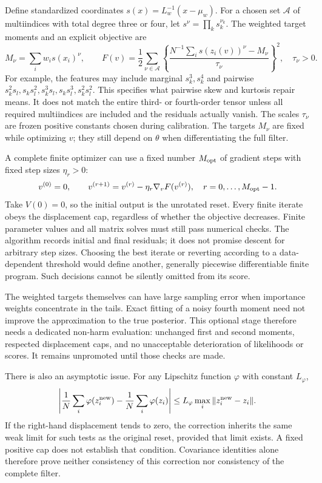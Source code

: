 \documentclass[11pt,a4paper]{article}
\begin{document}
Define standardized coordinates \(s(x)=L_w^{-1}(x-\mu_w)\).
For a chosen set \(\mathcal A\) of multiindices with total degree three
or four, let \(s^\nu=\prod_k s_k^{\nu_k}\). The weighted target moments
and an explicit objective are
\begin{equation}
\label{eq:moment-objective}
 M_\nu=\sum_iw_i s(x_i)^\nu,\qquad
 F(v)=\frac12\sum_{\nu\in\mathcal A}
 \left\{\frac{N^{-1}\sum_i s(z_i(v))^\nu-M_\nu}{\tau_\nu}\right\}^{\!2},
 \quad \tau_\nu>0 .
\end{equation}
For example, the features may include marginal \(s_k^3,s_k^4\) and
pairwise \(s_k^2s_l,s_ks_l^2,s_k^3s_l,s_ks_l^3,s_k^2s_l^2\).
This specifies what pairwise skew and kurtosis repair means. It does not
match the entire third- or fourth-order tensor unless all required
multiindices are included and the residuals actually vanish.
The scales \(\tau_\nu\) are frozen positive constants chosen during
calibration. The targets \(M_\nu\) are fixed while optimizing \(v\);
they still depend on \(\theta\) when differentiating the full filter.

A complete finite optimizer can use a fixed number \(M_{\rm opt}\) of
gradient steps with fixed step sizes \(\eta_r>0\):
\begin{equation}
\label{eq:fixed-optimizer}
 v^{(0)}=0,\qquad
 v^{(r+1)}=v^{(r)}-\eta_r\nabla_v F(v^{(r)}),
 \quad r=0,\ldots,M_{\rm opt}-1.
\end{equation}
Take \(V(0)=0\), so the initial output is the unrotated reset.
Every finite iterate obeys the displacement cap, regardless of whether
the objective decreases. Finite parameter values and all matrix solves
must still pass numerical checks. The algorithm records initial and
final residuals; it does not promise descent for arbitrary step sizes.
Choosing the best iterate or reverting according to a data-dependent
threshold would define another, generally piecewise differentiable
finite program. Such decisions cannot be silently omitted from its score.

The weighted targets themselves can have large sampling error when
importance weights concentrate in the tails. Exact fitting of a noisy
fourth moment need not improve the approximation to the true posterior.
This optional stage therefore needs a dedicated non-harm evaluation:
unchanged first and second moments, respected displacement caps, and
no unacceptable deterioration of likelihoods or scores. It remains
unpromoted until those checks are made.

There is also an asymptotic issue. For any Lipschitz function \(\varphi\)
with constant \(L_\varphi\),
\begin{equation}
\label{eq:weak-displacement}
 \left|\frac1N\sum_i\varphi(z_i^{\rm new})
       -\frac1N\sum_i\varphi(z_i)\right|
 \leq L_\varphi\max_i\|z_i^{\rm new}-z_i\|.
\end{equation}
If the right-hand displacement tends to zero, the correction inherits
the same weak limit for such tests as the original reset, provided that
limit exists. A fixed positive cap does not establish that condition.
Covariance identities alone therefore prove neither consistency of this
correction nor consistency of the complete filter.
\end{document}
